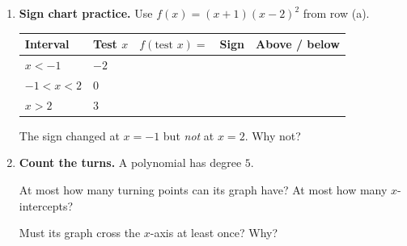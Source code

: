 \documentclass[10pt]{article}
\begin{document}
\begin{tcolorbox}[colback=white, colframe=black!40, title=\textbf{Tier R --- Remediate},
    fonttitle=\bfseries, arc=1.5mm, left=3mm, right=3mm, top=2mm, bottom=2mm, breakable]
\begin{enumerate}[leftmargin=1.7em, itemsep=9pt]
  \item \textbf{Sign chart practice.} Use $f(x) = (x+1)(x-2)^2$ from row (a).

    \vspace{3pt}
    \renewcommand{\arraystretch}{1.5}
    \begin{tabularx}{\linewidth}{|C{2.6cm}|C{1.6cm}|C{3.6cm}|C{1.8cm}|X|}
    \hline
    \textbf{Interval} & \textbf{Test $x$} & \textbf{$f(\text{test }x) = $} & \textbf{Sign} & \textbf{Above / below} \\ \hline
    $x<-1$    & $-2$ & & & \\ \hline
    $-1<x<2$  & $0$  & & & \\ \hline
    $x>2$     & $3$  & & & \\ \hline
    \end{tabularx}

    \vspace{2pt}
    The sign changed at $x=-1$ but \emph{not} at $x=2$. Why not? \blank{5.6cm}

  \item \textbf{Count the turns.} A polynomial has degree $5$.

    \vspace{2pt}
    At most how many turning points can its graph have? \blank{1.2cm} \quad At most how many
    $x$-intercepts? \blank{1.2cm}

    \vspace{2pt}
    Must its graph cross the $x$-axis at least once? \blank{1.2cm} \; Why? \blank{5.0cm}
\end{enumerate}
\end{tcolorbox}
\end{document}
